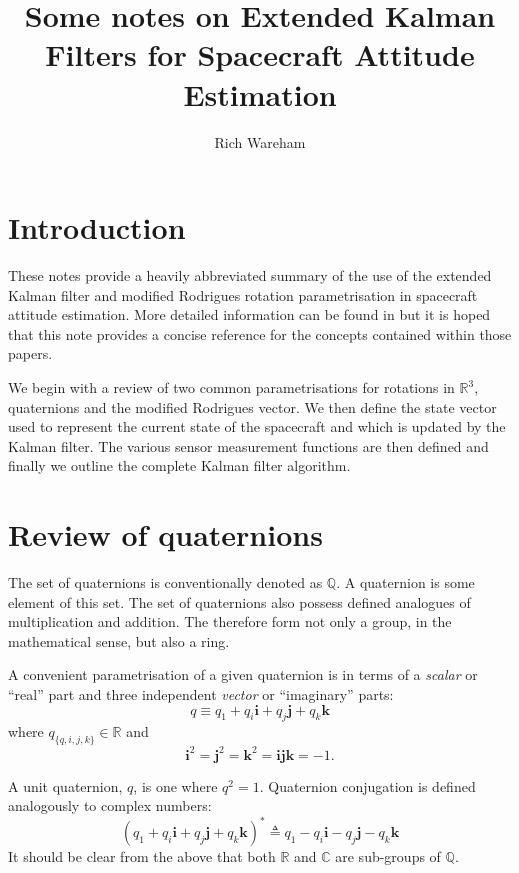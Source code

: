 \documentclass[a4paper]{paper}
\title{Some notes on Extended Kalman Filters for Spacecraft Attitude Estimation}
\author{Rich Wareham}
\begin{document}
\maketitle

\section{Introduction}

These notes provide a heavily abbreviated summary of the use of the extended
Kalman filter and modified Rodrigues rotation parametrisation in spacecraft
attitude estimation. More detailed information can be found in
\cite{crassidis1996attitude, karlgaard2009nonsingular} but it is hoped that this
note provides a concise reference for the concepts contained within those
papers.

We begin with a review of two common parametrisations for rotations in
$\mathbb{R}^3$, quaternions and the modified Rodrigues vector. We then define
the state vector used to represent the current state of the spacecraft and which
is updated by the Kalman filter. The various sensor measurement functions are
then defined and finally we outline the complete Kalman filter algorithm.

\section{Review of quaternions}

The set of quaternions is conventionally denoted as $\mathbb{Q}$. A quaternion
is some element of this set. The set of quaternions also possess defined
analogues of multiplication and addition. The therefore form not only a group,
in the mathematical sense, but also a ring.

A convenient parametrisation of a given quaternion is in terms of a
\emph{scalar} or ``real'' part and three independent \emph{vector} or
``imaginary'' parts:
$$
q \equiv q_1 + q_i \mathbf{i} + q_j \mathbf{j} + q_k \mathbf{k}
$$
where $q_{\{q,i,j,k\}} \in \mathbb{R}$ and
$$
\mathbf{i}^2 = \mathbf{j}^2 = \mathbf{k}^2 = \mathbf{ijk} = -1.
$$

A unit quaternion, $q$, is one where $q^2 = 1$. Quaternion conjugation is
defined analogously to complex numbers:
$$
\left(
	q_1 + q_i \mathbf{i} + q_j \mathbf{j} + q_k \mathbf{k}
\right)^* \triangleq
	q_1 - q_i \mathbf{i} - q_j \mathbf{j} - q_k \mathbf{k}
$$
It should be clear from the above that both $\mathbb{R}$ and $\mathbb{C}$ are
sub-groups of $\mathbb{Q}$.
\end{document}
